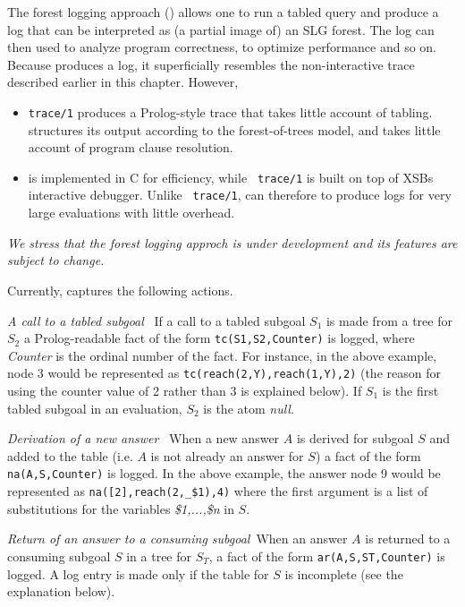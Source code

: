 The forest logging approach ({\tt \ctrace}) allows one to run a tabled
query and produce a log that can be interpreted as (a partial image
of) an SLG forest.  The log can then used to analyze program
correctness, to optimize performance and so on.  Because \ctrace{}
  produces a log, it superficially resembles the non-interactive trace
  described earlier in this chapter.  However,
\begin{itemize}
\item {\tt trace/1} produces a Prolog-style trace that takes little
  account of tabling.  \ctrace{} structures its output according to
  the forest-of-trees model, and takes little account of program
  clause resolution.

\item \ctrace{} is implemented in C for efficiency, while {\tt
  trace/1} is built on top of XSBs interactive debugger.  Unlike {\tt
  trace/1}, \ctrace{} can therefore to produce logs for very large
  evaluations with little overhead.
\end{itemize}

{\em We stress that the forest logging approch is under development and
  its features are subject to change.}

Currently, \ctrace{} captures the following actions.

\bi
\item {\em A call to a tabled subgoal}~ If a call to a tabled subgoal
  $S_1$ is made from a tree for $S_2$ a Prolog-readable fact of the
  form {\tt tc(S1,S2,Counter)} is logged, where {\em Counter} is
  the ordinal number of the fact.  For instance, in the above example,
  node 3 would be represented as {\tt tc(reach(2,Y),reach(1,Y),2)}
  (the reason for using the counter value of 2 rather than 3 is
  explained below).  If $S_1$ is the first tabled subgoal in an
  evaluation, $S_2$ is the atom {\em null}.

\item {\em Derivation of a new answer}~ When a new answer $A$ is
  derived for subgoal $S$ and added to the table (i.e. $A$ is not
  already an answer for $S$) a fact of the form {\tt na(A,S,Counter)}
  is logged.  In the above example, the answer node 9 would be
  represented as {\tt na([2],reach(2,\_\$1),4)} where the first argument
  is a list of substitutions for the variables {\em \$1,...,\$n} in
  $S$.

\item {\em Return of an answer to a consuming subgoal}~When an answer
  $A$ is returned to a consuming subgoal $S$ in a tree for $S_T$, a
  fact of the form {\tt ar(A,S,ST,Counter)} is logged.  A log entry is
  made only if the table for $S$ is incomplete (see the explanation
  below).

